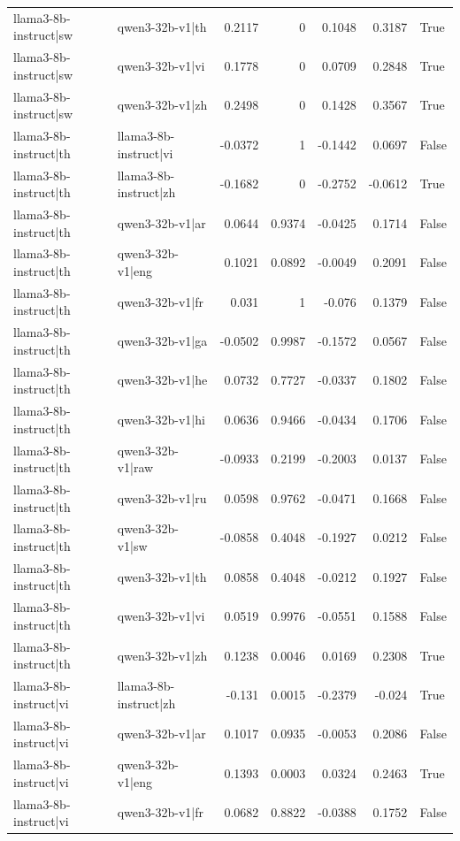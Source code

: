 \begin{table}
\begin{tabular}{l l r r r r l}
llama3-8b-instruct|sw & qwen3-32b-v1|th & 0.2117 & 0 & 0.1048 & 0.3187 & True \\
llama3-8b-instruct|sw & qwen3-32b-v1|vi & 0.1778 & 0 & 0.0709 & 0.2848 & True \\
llama3-8b-instruct|sw & qwen3-32b-v1|zh & 0.2498 & 0 & 0.1428 & 0.3567 & True \\
llama3-8b-instruct|th & llama3-8b-instruct|vi & -0.0372 & 1 & -0.1442 & 0.0697 & False \\
llama3-8b-instruct|th & llama3-8b-instruct|zh & -0.1682 & 0 & -0.2752 & -0.0612 & True \\
llama3-8b-instruct|th & qwen3-32b-v1|ar & 0.0644 & 0.9374 & -0.0425 & 0.1714 & False \\
llama3-8b-instruct|th & qwen3-32b-v1|eng & 0.1021 & 0.0892 & -0.0049 & 0.2091 & False \\
llama3-8b-instruct|th & qwen3-32b-v1|fr & 0.031 & 1 & -0.076 & 0.1379 & False \\
llama3-8b-instruct|th & qwen3-32b-v1|ga & -0.0502 & 0.9987 & -0.1572 & 0.0567 & False \\
llama3-8b-instruct|th & qwen3-32b-v1|he & 0.0732 & 0.7727 & -0.0337 & 0.1802 & False \\
llama3-8b-instruct|th & qwen3-32b-v1|hi & 0.0636 & 0.9466 & -0.0434 & 0.1706 & False \\
llama3-8b-instruct|th & qwen3-32b-v1|raw & -0.0933 & 0.2199 & -0.2003 & 0.0137 & False \\
llama3-8b-instruct|th & qwen3-32b-v1|ru & 0.0598 & 0.9762 & -0.0471 & 0.1668 & False \\
llama3-8b-instruct|th & qwen3-32b-v1|sw & -0.0858 & 0.4048 & -0.1927 & 0.0212 & False \\
llama3-8b-instruct|th & qwen3-32b-v1|th & 0.0858 & 0.4048 & -0.0212 & 0.1927 & False \\
llama3-8b-instruct|th & qwen3-32b-v1|vi & 0.0519 & 0.9976 & -0.0551 & 0.1588 & False \\
llama3-8b-instruct|th & qwen3-32b-v1|zh & 0.1238 & 0.0046 & 0.0169 & 0.2308 & True \\
llama3-8b-instruct|vi & llama3-8b-instruct|zh & -0.131 & 0.0015 & -0.2379 & -0.024 & True \\
llama3-8b-instruct|vi & qwen3-32b-v1|ar & 0.1017 & 0.0935 & -0.0053 & 0.2086 & False \\
llama3-8b-instruct|vi & qwen3-32b-v1|eng & 0.1393 & 0.0003 & 0.0324 & 0.2463 & True \\
llama3-8b-instruct|vi & qwen3-32b-v1|fr & 0.0682 & 0.8822 & -0.0388 & 0.1752 & False \\

\end{tabular}
\end{table}
